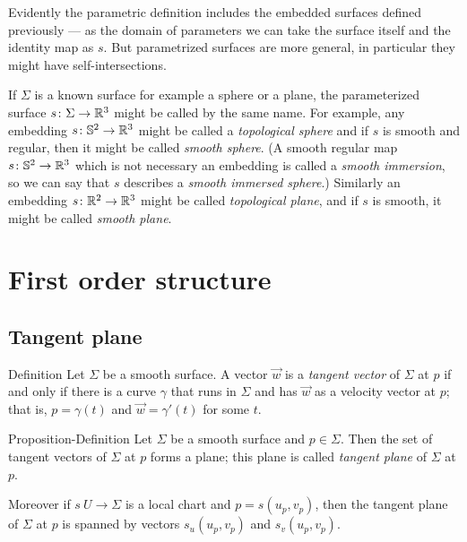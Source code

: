 Evidently the parametric definition includes the embedded surfaces defined previously --- as the domain of parameters we can take the surface itself and the identity map as $s$.
But parametrized surfaces are more general, in particular they  might  have self-intersections.

If $\Sigma$ is a known surface for example a sphere or a plane, the parameterized surface $s\colon\Sigma\to\mathbb{R}^3$ might be called by the same name.
For example, any embedding $s\colon\mathbb{S}^2\to\mathbb{R}^3$ might be called a \emph{topological sphere}
and if $s$ is smooth and regular, then it might be called \emph{smooth sphere}.
(A smooth regular map $s\colon\mathbb{S}^2\to\mathbb{R}^3$ which is not necessary an embedding is called a \emph{smooth immersion}, so we can say that $s$ describes a \emph{smooth immersed sphere}.) 
Similarly an embedding $s\colon\mathbb{R}^2\to\mathbb{R}^3$ might be called \emph{topological plane},
and if $s$ is smooth, it might be called \emph{smooth plane}.

\chapter{First order structure}

\section{Tangent plane}

\begin{thm}{Definition}\label{def:tangent-vector}
Let $\Sigma$ be a smooth surface.
A vector $\vec w$ is a \emph{tangent vector} of $\Sigma$ at $p$ if and only if there is a curve $\gamma$ that runs in $\Sigma$ and has $\vec w$ as a velocity vector at $p$;
that is, $p=\gamma(t)$ and $\vec w=\gamma'(t)$ for some $t$.
\end{thm}

\begin{thm}{Proposition-Definition}\label{def:tangent-plane}
Let $\Sigma$ be a smooth surface and $p\in \Sigma$.
Then the set of tangent vectors of $\Sigma$ at $p$ forms a plane;
this plane is called \emph{tangent plane} of $\Sigma$ at $p$.

Moreover if $s\:U\to \Sigma$ is a local chart and $p=s(u_p,v_p)$, then 
the tangent plane of $\Sigma$ at $p$ is spanned by vectors $s_u(u_p,v_p)$ and $s_v(u_p,v_p)$.
\end{thm}

